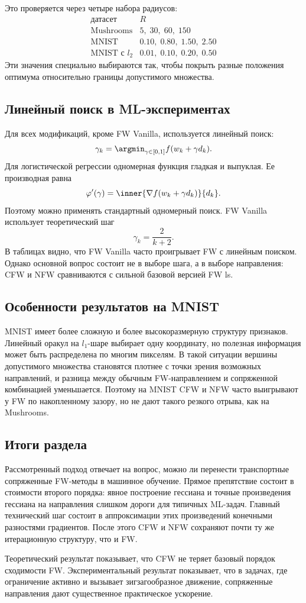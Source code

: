 Это проверяется через четыре набора радиусов:
\[
\begin{array}{c|c}
\text{датасет} & R \\
\hline
\text{Mushrooms} & 5,\;30,\;60,\;150\\
\text{MNIST} & 0.10,\;0.80,\;1.50,\;2.50\\
\text{MNIST с }l_2 & 0.01,\;0.10,\;0.20,\;0.50
\end{array}
\]
Эти значения специально выбираются так, чтобы покрыть разные положения оптимума относительно
границы допустимого множества.

\subsection{Линейный поиск в ML-экспериментах}

Для всех модификаций, кроме FW Vanilla, используется линейный поиск:
\[
    \gamma_k=\argmin_{\gamma\in[0,1]}f(w_k+\gamma d_k).
\]
Для логистической регрессии одномерная функция гладкая и выпуклая.
Ее производная равна
\[
    \varphi'(\gamma)
    =
    \inner{\nabla f(w_k+\gamma d_k)}{d_k}.
\]
Поэтому можно применять стандартный одномерный поиск.
FW Vanilla использует теоретический шаг
\[
    \gamma_k=\frac{2}{k+2}.
\]
В таблицах видно, что FW Vanilla часто проигрывает FW с линейным поиском.
Однако основной вопрос состоит не в выборе шага, а в выборе направления: CFW и NFW сравниваются
с сильной базовой версией FW ls.

\subsection{Особенности результатов на MNIST}

MNIST имеет более сложную и более высокоразмерную структуру признаков.
Линейный оракул на $l_1$-шаре выбирает одну координату, но полезная информация может быть
распределена по многим пикселям.
В такой ситуации вершины допустимого множества становятся плотнее с точки зрения возможных
направлений, и разница между обычным FW-направлением и сопряженной комбинацией уменьшается.
Поэтому на MNIST CFW и NFW часто выигрывают у FW по накопленному зазору, но не дают такого
резкого отрыва, как на Mushrooms.

\subsection{Итоги раздела}

Рассмотренный подход отвечает на вопрос, можно ли перенести транспортные сопряженные FW-методы
в машинное обучение.
Прямое препятствие состоит в стоимости второго порядка: явное построение гессиана и точные
произведения гессиана на направления слишком дороги для типичных ML-задач.
Главный технический шаг состоит в аппроксимации этих произведений конечными разностями
градиентов.
После этого CFW и NFW сохраняют почти ту же итерационную структуру, что и FW.

Теоретический результат показывает, что CFW не теряет базовый порядок сходимости FW.
Экспериментальный результат показывает, что в задачах, где ограничение активно и вызывает
зигзагообразное движение, сопряженные направления дают существенное практическое ускорение.

